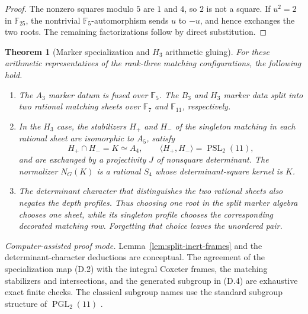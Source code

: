 \documentclass[11pt]{article}
\newtheorem{theorem}{Theorem}[section]
\theoremstyle{definition}
\theoremstyle{remark}
\newcommand{\F}{\mathbb{F}}
\begin{document}
\begin{proof}
The nonzero squares modulo $5$ are $1$ and $4$, so $2$ is not a square.
If $u^2=2$ in $\F_{25}$, the nontrivial $\F_5$-automorphism sends $u$
to $-u$, and hence exchanges the two roots.  The remaining
factorizations follow by direct substitution.
\end{proof}

\begin{theorem}[Marker specialization and \(H_3\) arithmetic gluing]
\label{thm:rank-three-arithmetic-gluing}
For these arithmetic representatives of the rank-three matching
configurations, the following hold.
\begin{enumerate}[label=\textup{(\alph*)},leftmargin=*]
\item The $A_3$ marker datum is fused over $\F_5$.  The $B_3$ and
$H_3$ marker data split into two rational matching sheets over $\F_7$
and $\F_{11}$, respectively.
\item In the $H_3$ case, the stabilizers $H_+$ and $H_-$ of the
singleton matching in each rational sheet are isomorphic to $A_5$,
satisfy
\[
 H_+\cap H_-=K\simeq A_4,\qquad
 \langle H_+,H_-\rangle=\operatorname{PSL}_2(11),
                                                               \tag{D.4}
\]
and are exchanged by a projectivity $J$ of nonsquare determinant.  The
normalizer \(N_G(K)\) is a rational \(S_4\) whose determinant-square
kernel is \(K\).
\item The determinant character that distinguishes the two rational
sheets also negates the depth profiles.  Thus choosing one root in the
split marker algebra chooses one sheet, while its singleton profile
chooses the corresponding decorated matching row.  Forgetting that
choice leaves the unordered pair.
\end{enumerate}
\end{theorem}

\noindent\emph{Computer-assisted proof mode.}
Lemma~\ref{lem:split-inert-frames} and the determinant-character
deductions are conceptual.  The agreement of the specialization map
(D.2) with the integral Coxeter frames, the matching stabilizers and
intersections, and the generated subgroup in (D.4) are exhaustive
exact finite checks.
The classical subgroup names use the standard subgroup structure of
$\operatorname{PGL}_2(11)$ \cite{Atlas1985,Giudici2007}.
\end{document}
